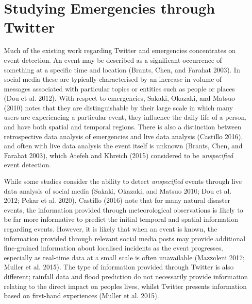 \documentclass[a4paper, notitlepage]{extreport}
\begin{document}
\hypertarget{studying-emergencies-through-twitter}{%
\section{Studying Emergencies through
Twitter}\label{studying-emergencies-through-twitter}}

Much of the existing work regarding Twitter and emergencies concentrates
on event detection. An event may be described as a significant
occurrence of something at a specific time and location (Brants, Chen,
and Farahat 2003). In social media these are typically characterised by
an increase in volume of messages associated with particular topics or
entities such as people or places (Dou et al. 2012). With respect to
emergencies, Sakaki, Okazaki, and Matsuo (2010) notes that they are
distinguishable by their large scale in which many users are
experiencing a particular event, they influence the daily life of a
person, and have both spatial and temporal regions. There is also a
distinction between retrospective data analysis of emergencies and live
data analysis (Castillo 2016), and often with live data analysis the
event itself is unknown (Brants, Chen, and Farahat 2003), which Atefeh
and Khreich (2015) considered to be \emph{unspecified} event detection.

While some studies consider the ability to detect \emph{unspecified}
events through live data analysis of social media (Sakaki, Okazaki, and
Matsuo 2010; Dou et al. 2012; Pekar et al. 2020), Castillo (2016) note
that for many natural disaster events, the information provided through
meteorological observations is likely to be far more informative to
predict the initial temporal and spatial information regarding events.
However, it is likely that when an event is known, the information
provided through relevant social media posts may provide additional
fine-grained information about localised incidents as the event
progresses, especially as real-time data at a small scale is often
unavailable (Mazzoleni 2017; Muller et al. 2015). The type of
information provided through Twitter is also different; rainfall data
and flood prediction do not necessarily provide information relating to
the direct impact on peoples lives, whilst Twitter presents information
based on first-hand experiences (Muller et al. 2015).
\end{document}
